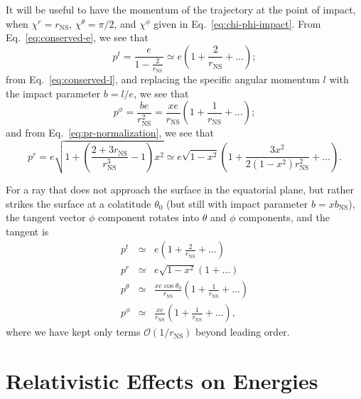 \documentclass[modern]{aastex631}
\newcommand{\order}[1]{\mathcal{O}\left( #1 \right)}
\newcommand{\bNS}{b_\mathrm{NS}}
\newcommand{\rNS}{r_\mathrm{NS}}
\begin{document}
It will be useful to have the momentum of the trajectory at the point of impact,
when $\chi^r = \rNS$, $\chi^\theta = \pi/2$, and $\chi^\phi$ given in Eq.\
\eqref{eq:chi-phi-impact}.  From Eq.\ \eqref{eq:conserved-e}, we see that 
\begin{equation}
    p^t = \frac{e}{1 - \frac{2}{\rNS}} \simeq e \left( 1 + \frac{2}{\rNS} + \ldots \right);
\end{equation}
from Eq.\ \eqref{eq:conserved-l}, and replacing the specific angular momentum
$l$ with the impact parameter $b = l/e$, we see that 
\begin{equation}
    p^\phi = \frac{b e}{\rNS^2} = \frac{x e}{\rNS} \left( 1 + \frac{1}{\rNS} + \ldots \right);
\end{equation}
and from Eq.\ \eqref{eq:pr-normalization}, we see that 
\begin{equation}
    p^r = e \sqrt{1 + \left( \frac{2 + 3 \rNS}{\rNS^3} - 1 \right) x^2} \simeq e \sqrt{1-x^2} \left( 1 + \frac{3 x^2}{2 \left( 1 - x^2 \right) \rNS^2} + \ldots \right).
\end{equation}

For a ray that does not approach the surface in the equatorial plane, but rather
strikes the surface at a colatitude $\theta_0$ (but still with impact parameter
$b = x \bNS$), the tangent vector $\phi$ component rotates into $\theta$ and
$\phi$ components, and the tangent is 
\begin{eqnarray}
    \label{eq:pt-final}
    p^t & \simeq & e \left( 1 + \frac{2}{\rNS} + \ldots \right) \\ 
    \label{eq:pr-final}
    p^r & \simeq & e \sqrt{1-x^2} \left( 1 + \ldots \right) \\
    \label{eq:ptheta-final}
    p^\theta & \simeq & \frac{x e \cos \theta_0}{\rNS} \left( 1 + \frac{1}{\rNS} + \ldots \right) \\
    \label{eq:pphi-final}
    p^\phi & \simeq & \frac{x e}{\rNS} \left( 1 + \frac{1}{\rNS} + \ldots \right),
\end{eqnarray}
where we have kept only terms $\order{1/\rNS}$ beyond leading order.

\section{Relativistic Effects on Energies}
\label{sec:relativistic}
\end{document}
